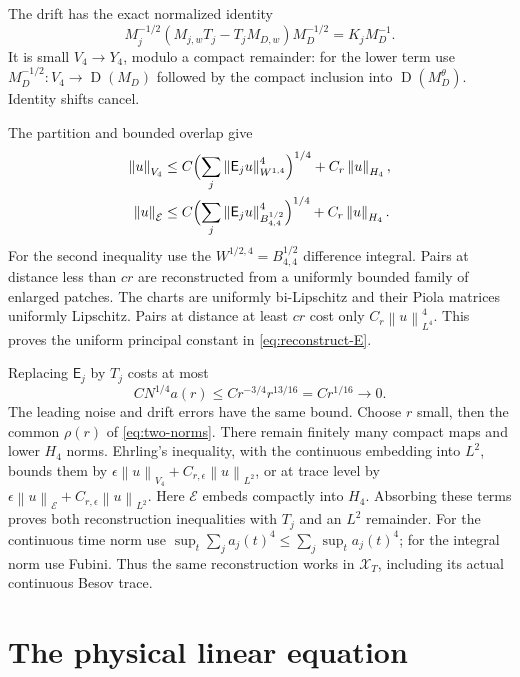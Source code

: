 \documentclass[11pt]{article}
\numberwithin{equation}{section}
\theoremstyle{remark}
\newcommand{\calE}{\mathcal E}
\newcommand{\calX}{\mathcal X}
\newcommand{\norm}[1]{\left\lVert#1\right\rVert}
\DeclareMathOperator{\Dom}{D}
\begin{document}
The drift has the exact normalized identity
\begin{equation}\label{eq:drift-commutator}
 M_j^{-1/2}(M_{j,w}T_j-T_jM_{D,w})M_D^{-1/2}
 =K_jM_D^{-1}.
\end{equation}
It is small $V_4\to Y_4$, modulo a compact remainder: for the lower
term use $M_D^{-1/2}:V_4\to\Dom(M_D)$ followed by the compact
inclusion into $\Dom(M_D^\theta)$. Identity shifts cancel.

The partition and bounded overlap give
\begin{align}\label{eq:reconstruct-E}
 \norm{u}_{V_4}&\leq C\Bigl(\sum_j\norm{\mathsf E_ju}_{W^{1,4}}^4\Bigr)^{1/4}
 +C_r\norm{u}_{H_4},\\
 \norm{u}_{\calE}&\leq C\Bigl(\sum_j\norm{\mathsf E_ju}_{B^{1/2}_{4,4}}^4\Bigr)^{1/4}
 +C_r\norm{u}_{H_4}.\notag
\end{align}
For the second inequality use the $W^{1/2,4}=B^{1/2}_{4,4}$
difference integral. Pairs at distance less than $cr$ are reconstructed
from a uniformly bounded family of enlarged patches. The charts are
uniformly bi-Lipschitz and their Piola matrices uniformly Lipschitz.
Pairs at distance at least $cr$ cost only $C_r\norm{u}_{L^4}^4$.
This proves the uniform principal constant in \eqref{eq:reconstruct-E}.

Replacing $\mathsf E_j$ by $T_j$ costs at most
\begin{equation}\label{eq:count-absorption}
 CN^{1/4}a(r)\leq Cr^{-3/4}r^{13/16}=Cr^{1/16}\longrightarrow0.
\end{equation}
The leading noise and drift errors have the same bound. Choose $r$
small, then the common $\rho(r)$ of \eqref{eq:two-norms}. There
remain finitely many compact maps and lower $H_4$ norms. Ehrling's
inequality, with the continuous embedding into $L^2$, bounds them by
$\epsilon\norm{u}_{V_4}+C_{r,\epsilon}\norm{u}_{L^2}$, or at trace
level by $\epsilon\norm{u}_{\calE}+C_{r,\epsilon}\norm{u}_{L^2}$.
Here $\calE$ embeds compactly into $H_4$. Absorbing these terms
proves both reconstruction inequalities with $T_j$ and an $L^2$
remainder. For the continuous time norm use
$\sup_t\sum_j a_j(t)^4\leq\sum_j\sup_t a_j(t)^4$;
for the integral norm use Fubini. Thus the same reconstruction works
in $\calX_T$, including its actual continuous Besov trace.

\section{The physical linear equation}\label{sec:physical-linear}
\end{document}
